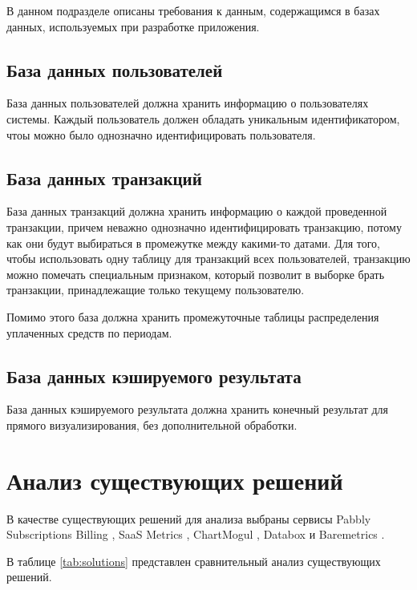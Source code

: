 В данном подразделе описаны требования к данным, содержащимся в базах данных, используемых при разработке приложения.

\subsection{База данных пользователей}

База данных пользователей должна хранить информацию о пользователях системы. Каждый пользователь должен обладать уникальным идентификатором, чтоы можно было однозначно идентифицировать пользователя.

\subsection{База данных транзакций}

База данных транзакций должна хранить информацию о каждой проведенной транзакции, причем неважно однозначно идентифицировать транзакцию, потому как они будут выбираться в промежутке между какими-то датами. Для того, чтобы использовать одну таблицу для транзакций всех пользователей, транзакцию можно помечать специальным признаком, который позволит в выборке брать транзакции, принадлежащие только текущему пользователю.

Помимо этого база должна хранить промежуточные таблицы распределения уплаченных средств по периодам.

\subsection{База данных кэшируемого результата}

База данных кэшируемого результата должна хранить конечный результат для прямого визуализирования, без дополнительной обработки.

\section{Анализ существующих решений}

В качестве существующих решений для анализа выбраны сервисы Pabbly Subscriptions Billing \cite{pbsubbil}, SaaS Metrics \cite{saas}, ChartMogul \cite{chartmogul}, Databox \cite{databox} и Baremetrics \cite{baremetrics}.

В таблице \ref{tab:solutions} представлен сравнительный анализ существующих решений.

